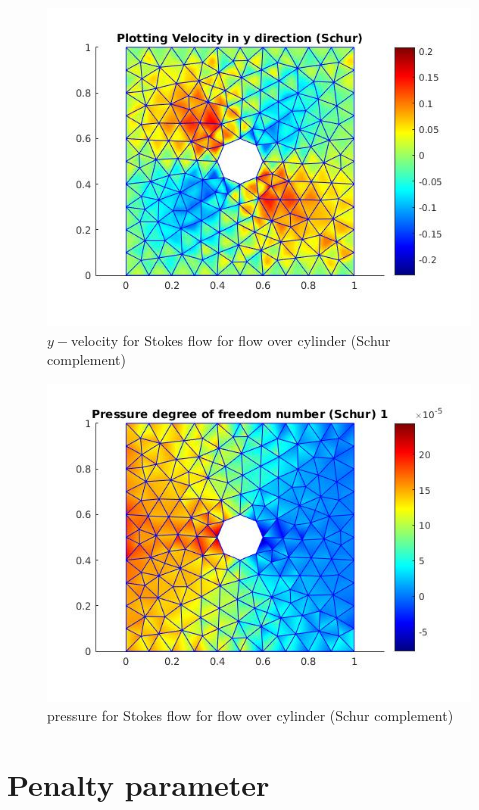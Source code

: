 \documentclass[a4paper,12pt]{book}
\begin{document}
\begin{figure}
  \includegraphics[width=\linewidth]{velocity_Y_schur.jpg}
  \caption{$y-$velocity for Stokes flow for flow over cylinder (Schur complement)}
  \label{fig:velocity_y_cylinder_stokes_schur}
\end{figure}

\begin{figure}
  \includegraphics[width=\linewidth]{pressure_Schur.jpg}
  \caption{pressure for Stokes flow for flow over cylinder (Schur complement)}
  \label{fig:pressure_cylinder_stokes_schur}
\end{figure}

\section{Penalty parameter}
\end{document}
